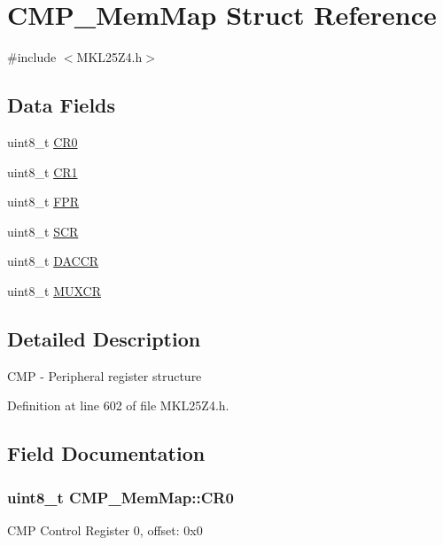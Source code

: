 \hypertarget{struct_c_m_p___mem_map}{}\section{C\+M\+P\+\_\+\+Mem\+Map Struct Reference}
\label{struct_c_m_p___mem_map}


{\ttfamily \#include $<$M\+K\+L25\+Z4.\+h$>$}

\subsection*{Data Fields}
\begin{DoxyCompactItemize}
\item 
uint8\+\_\+t \hyperlink{struct_c_m_p___mem_map_ad56a4dbaba4426c89e4d9b256173ab84}{C\+R0}
\item 
uint8\+\_\+t \hyperlink{struct_c_m_p___mem_map_ab790f5d18ef53ba0c9cfc2b5f3ce6668}{C\+R1}
\item 
uint8\+\_\+t \hyperlink{struct_c_m_p___mem_map_aa793447f43fa77759b6eaf1620bed4bc}{F\+PR}
\item 
uint8\+\_\+t \hyperlink{struct_c_m_p___mem_map_a3fe55f0243869b50fc54acb9c194d970}{S\+CR}
\item 
uint8\+\_\+t \hyperlink{struct_c_m_p___mem_map_a64ad86546fe53058b6fdd5ca1252f7c2}{D\+A\+C\+CR}
\item 
uint8\+\_\+t \hyperlink{struct_c_m_p___mem_map_a3b48de300c4b4116ebb942659a2948a2}{M\+U\+X\+CR}
\end{DoxyCompactItemize}


\subsection{Detailed Description}
C\+MP -\/ Peripheral register structure 

Definition at line 602 of file M\+K\+L25\+Z4.\+h.



\subsection{Field Documentation}
\subsubsection[{\texorpdfstring{C\+R0}{CR0}}]{\setlength{\rightskip}{0pt plus 5cm}uint8\+\_\+t C\+M\+P\+\_\+\+Mem\+Map\+::\+C\+R0}\hypertarget{struct_c_m_p___mem_map_ad56a4dbaba4426c89e4d9b256173ab84}{}\label{struct_c_m_p___mem_map_ad56a4dbaba4426c89e4d9b256173ab84}
C\+MP Control Register 0, offset\+: 0x0 


